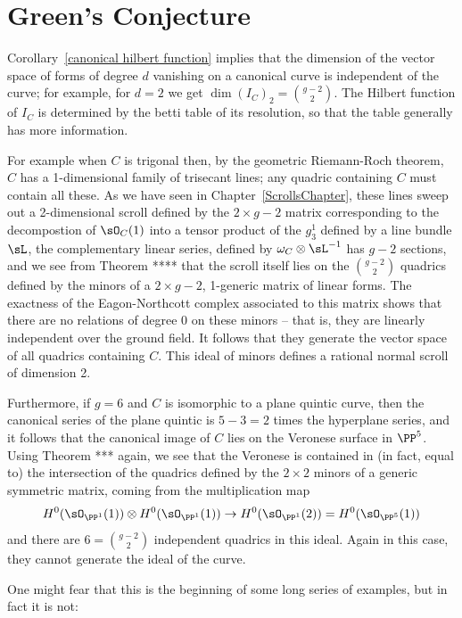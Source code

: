 \section{Green's Conjecture}

Corollary~\ref{canonical hilbert function} implies that the dimension of the vector space of forms of degree $d$
vanishing on a canonical curve is independent of the curve; for example, for $d=2$ we get
$
\dim ({I_{C}})_{2} = {g-2\choose 2}.
$
The Hilbert function of $I_C$ is determined by the betti table of its resolution, so that the table generally has more information.

 For example
when $C$ is trigonal then, by the geometric Riemann-Roch theorem, $C$ has a 1-dimensional family of trisecant lines; any quadric containing $C$ must contain all these. As we have seen in Chapter~\ref{ScrollsChapter}, these lines sweep
out a 2-dimensional scroll defined by the $2\times g-2$ matrix corresponding to the decompostion of $\sO_C(1)$
into a tensor product of the $g^{1}_{3}$ defined by a line bundle $\sL$, the complementary linear series,
defined by $\omega_{C}\otimes \sL^{-1}$ has $g-2$ sections, and we see from Theorem ****
that the scroll itself lies on the ${g-2\choose 2}$ quadrics defined by the minors of a $2\times g-2$, 1-generic matrix of linear forms. The exactness of the Eagon-Northcott complex associated to this matrix shows that there are no relations of degree 0 on these minors -- that is, they are linearly independent over the ground field. It follows that they generate the vector space of all quadrics containing $C$. This
ideal of minors defines a rational normal scroll of dimension 2.

Furthermore, if $g = 6$ and $C$ is isomorphic to a plane quintic curve, then the canonical series of the plane quintic is $5-3 = 2$ times the hyperplane series, and it follows that the canonical image of $C$ lies on the Veronese surface in $\PP^{5}$. Using Theorem *** again, we see that the Veronese is contained in (in fact, equal to) the intersection of the quadrics defined by the $2\times 2$ minors of a generic symmetric matrix, coming from the 
multiplication map 
$$
H^{0}(\sO_{\PP^{1}}(1))\otimes H^{0}(\sO_{\PP^{1}}(1)) \to H^{0}(\sO_{\PP^{1}}(2)) = H^{0}(\sO_{\PP^{5}}(1))
$$
and there are $6 = {g-2\choose 2}$ independent quadrics in this ideal. Again in this case, they cannot generate the ideal of the curve.

One might fear that this is the beginning of some long series of examples, but in fact it is not: 

